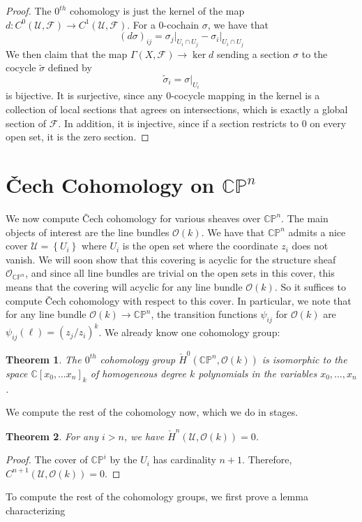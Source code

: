 \documentclass[psamsfonts, 12pt]{amsart}
\newtheorem{thm}{Theorem}[section]
\theoremstyle{definition}
\theoremstyle{remark}
\renewcommand{\O}{\mathcal{O}}
\renewcommand{\C}{\mathbb{C}}
\newcommand{\CP}{\mathbb{CP}}
\newcommand{\set}[1]{\left\lbrace #1 \right\rbrace}
\begin{document}
%
\begin{proof}
The $0^{th}$ cohomology is just the kernel of the map
$d : C^0(\mathcal{U},\mathcal{F}) \to C^1(\mathcal{U}, \mathcal{F})$.
For a $0$-cochain $\sigma$, we have that
\[
(d\sigma)_{ij} = \sigma_j\vert_{U_i \cap U_j} - \sigma_i\vert_{U_i \cap U_j}
\]
We then claim that the map $\Gamma(X, \mathcal{F}) \to \ker d$ sending a section
$\sigma$ to the cocycle $\tilde{\sigma}$ defined by
\[
\tilde{\sigma}_i = \sigma\vert_{U_i}
\]
is bijective. It is surjective, since any $0$-cocycle mapping in the kernel
is a collection of local sections that agrees on intersections, which is exactly
a global section of $\mathcal{F}$. In addition, it is injective, since if
a section restricts to $0$ on every open set, it is the zero section.
\end{proof}
%
\section{\v{C}ech Cohomology on $\CP^n$}
%
We now compute \v{C}ech cohomology for various sheaves over $\CP^n$. The main objects
of interest are the line bundles $\O(k)$. We have that $\CP^n$ admits a nice cover
$\mathcal{U} = \set{U_i}$ where $U_i$ is the open set where the coordinate $z_i$ does not
vanish. We will soon show that this covering is acyclic for the structure sheaf
$\O_{\CP^n}$, and since all line bundles are trivial on the open sets in this cover, this
means that the covering will acyclic for any line bundle $\O(k)$. So it suffices to
compute \v{C}ech cohomology with respect to this cover. In particular, we note that for
any line bundle $\O(k) \to \CP^n$, the transition functions $\psi_{ij}$ for $\O(k)$
are $\psi_{ij}(\ell) = (z_j/z_i)^k$. We already know one cohomology group:
%
\begin{thm}
The $0^{th}$ cohomology group $\check{H}^0(\CP^n, \O(k))$ is isomorphic to the space
$\C[x_0, \ldots x_n]_k$ of homogeneous degree $k$ polynomials in the variables
$x_0, \ldots , x_n$.
\end{thm}
%
We compute the rest of the cohomology now, which we do in stages.
%
\begin{thm}
For any $i > n$, we have $\check{H}^n(\mathcal{U},\O(k)) = 0$.
\end{thm}
%
\begin{proof}
The cover of $\CP^i$ by the $U_i$ has cardinality $n+1$. Therefore,
$C^{n+1}(\mathcal{U}, \O(k)) = 0$.
\end{proof}
%
To compute the rest of the cohomology groups, we first prove a lemma characterizing
\end{document}
